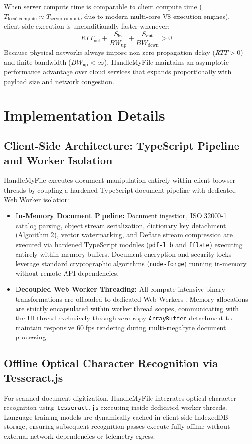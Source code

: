 \documentclass[journal]{IEEEtran}
\begin{document}
When server compute time is comparable to client compute time ($T_{\text{local\_compute}} \approx T_{\text{server\_compute}}$ due to modern multi-core V8 execution engines), client-side execution is unconditionally faster whenever:
\begin{equation}
RTT_{\text{net}} + \frac{S_{\text{in}}}{BW_{\text{up}}} + \frac{S_{\text{out}}}{BW_{\text{down}}} > 0
\end{equation}
Because physical networks always impose non-zero propagation delay ($RTT > 0$) and finite bandwidth ($BW_{\text{up}} < \infty$), HandleMyFile maintains an asymptotic performance advantage over cloud services that expands proportionally with payload size and network congestion.

\section{Implementation Details}

\subsection{Client-Side Architecture: TypeScript Pipeline and Worker Isolation}
HandleMyFile executes document manipulation entirely within client browser threads by coupling a hardened TypeScript document pipeline with dedicated Web Worker isolation:
\begin{itemize}[leftmargin=12pt, topsep=2pt, itemsep=1pt]
\item \textbf{In-Memory Document Pipeline:} Document ingestion, ISO 32000-1 catalog parsing, object stream serialization, dictionary key detachment (Algorithm 2), vector watermarking, and Deflate stream compression are executed via hardened TypeScript modules (\texttt{pdf-lib} and \texttt{fflate}) executing entirely within memory buffers. Document encryption and security locks leverage standard cryptographic algorithms (\texttt{node-forge}) running in-memory without remote API dependencies.
\item \textbf{Decoupled Web Worker Threading:} All compute-intensive binary transformations are offloaded to dedicated Web Workers \cite{whatwg2024workers}. Memory allocations are strictly encapsulated within worker thread scopes, communicating with the UI thread exclusively through zero-copy \texttt{ArrayBuffer} detachment to maintain responsive 60 fps rendering during multi-megabyte document processing.
\end{itemize}

\subsection{Offline Optical Character Recognition via Tesseract.js}
For scanned document digitization, HandleMyFile integrates optical character recognition using \texttt{tesseract.js} executing inside dedicated worker threads. Language training models are dynamically cached in client-side IndexedDB storage, ensuring subsequent recognition passes execute fully offline without external network dependencies or telemetry egress.
\end{document}
